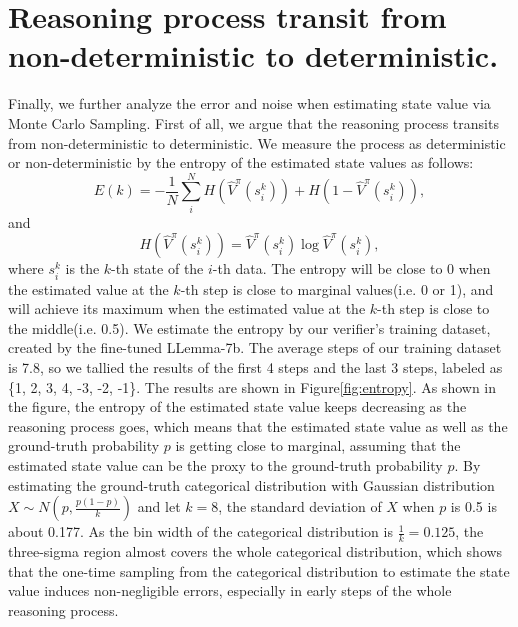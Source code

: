 \section{Reasoning process transit from non-deterministic to deterministic.}\label{app:noise}

Finally, we further analyze the error and noise when estimating state value via Monte Carlo Sampling. First of all, we argue that the reasoning process transits from non-deterministic to deterministic. We measure the process as deterministic or non-deterministic by the entropy of the estimated state values as follows:
\begin{equation}
    E(k)=-\frac{1}{N}\sum_i^N H(\hat{V}^\pi(s_i^k))+H(1-\hat{V}^\pi(s_i^k)), \nonumber
\end{equation}
and
\begin{equation}
    H(\hat{V}^\pi(s_i^k))=\hat{V}^\pi(s_i^k)\log \hat{V}^\pi(s_i^k), \nonumber
\end{equation}
where $s_i^k$ is the $k$-th state of the $i$-th data. The entropy will be close to 0 when the estimated value at the $k$-th step is close to marginal values(i.e. 0 or 1), and will achieve its maximum when the estimated value at the $k$-th step is close to the middle(i.e. 0.5). We estimate the entropy by our verifier's training dataset, created by the fine-tuned LLemma-7b. The average steps of our training dataset is 7.8, so we tallied the results of the first 4 steps and the last 3 steps, labeled as \{1, 2, 3, 4, -3, -2, -1\}. The results are shown in Figure\ref{fig:entropy}. As shown in the figure, the entropy of the estimated state value keeps decreasing as the reasoning process goes, which means that the estimated state value as well as the ground-truth probability $p$ is getting close to marginal, assuming that the estimated state value can be the proxy to the ground-truth probability $p$. By estimating the ground-truth categorical distribution with Gaussian distribution $X\sim N(p,\frac{p(1-p)}{k})$ and let $k=8$, the standard deviation of $X$ when $p$ is 0.5 is about 0.177. As the bin width of the categorical distribution is $\frac{1}{k}=0.125$, the three-sigma region almost covers the whole categorical distribution, which shows that the one-time sampling from the categorical distribution to estimate the state value induces non-negligible errors, especially in early steps of the whole reasoning process.
